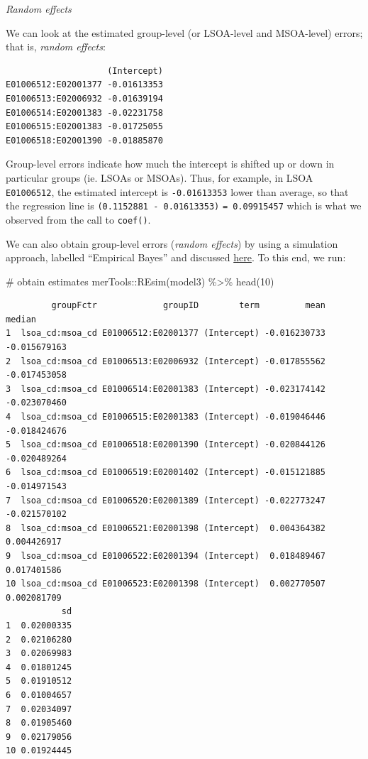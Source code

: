 \documentclass[
  letterpaper,
  DIV=11,
  numbers=noendperiod,
  oneside]{scrreprt}
\newenvironment{Shaded}{\begin{snugshade}}{\end{snugshade}}
\newcommand{\CommentTok}[1]{\textcolor[rgb]{0.37,0.37,0.37}{#1}}
\newcommand{\DecValTok}[1]{\textcolor[rgb]{0.68,0.00,0.00}{#1}}
\newcommand{\FunctionTok}[1]{\textcolor[rgb]{0.28,0.35,0.67}{#1}}
\newcommand{\NormalTok}[1]{\textcolor[rgb]{0.00,0.23,0.31}{#1}}
\newcommand{\OtherTok}[1]{\textcolor[rgb]{0.00,0.23,0.31}{#1}}
\newcommand{\SpecialCharTok}[1]{\textcolor[rgb]{0.37,0.37,0.37}{#1}}
\begin{document}
\emph{Random effects}

We can look at the estimated group-level (or LSOA-level and MSOA-level)
errors; that is, \emph{random effects}:

\begin{Shaded}
\end{Shaded}

\begin{verbatim}
                    (Intercept)
E01006512:E02001377 -0.01613353
E01006513:E02006932 -0.01639194
E01006514:E02001383 -0.02231758
E01006515:E02001383 -0.01725055
E01006518:E02001390 -0.01885870
\end{verbatim}

Group-level errors indicate how much the intercept is shifted up or down
in particular groups (ie. LSOAs or MSOAs). Thus, for example, in LSOA
\texttt{E01006512}, the estimated intercept is \texttt{-0.01613353}
lower than average, so that the regression line is
\texttt{(0.1152881\ -\ 0.01613353)} \texttt{=\ 0.09915457} which is what
we observed from the call to \texttt{coef()}.

We can also obtain group-level errors (\emph{random effects}) by using a
simulation approach, labelled ``Empirical Bayes'' and discussed
\href{https://stat.ethz.ch/pipermail/r-sig-mixed-models/2009q4/002984.html}{here}.
To this end, we run:

\begin{Shaded}
\begin{Highlighting}[]
\CommentTok{\# obtain estimates}
\NormalTok{merTools}\SpecialCharTok{::}\FunctionTok{REsim}\NormalTok{(model3) }\SpecialCharTok{\%\textgreater{}\%} 
  \FunctionTok{head}\NormalTok{(}\DecValTok{10}\NormalTok{)}
\end{Highlighting}
\end{Shaded}

\begin{verbatim}
         groupFctr             groupID        term         mean       median
1  lsoa_cd:msoa_cd E01006512:E02001377 (Intercept) -0.016230733 -0.015679163
2  lsoa_cd:msoa_cd E01006513:E02006932 (Intercept) -0.017855562 -0.017453058
3  lsoa_cd:msoa_cd E01006514:E02001383 (Intercept) -0.023174142 -0.023070460
4  lsoa_cd:msoa_cd E01006515:E02001383 (Intercept) -0.019046446 -0.018424676
5  lsoa_cd:msoa_cd E01006518:E02001390 (Intercept) -0.020844126 -0.020489264
6  lsoa_cd:msoa_cd E01006519:E02001402 (Intercept) -0.015121885 -0.014971543
7  lsoa_cd:msoa_cd E01006520:E02001389 (Intercept) -0.022773247 -0.021570102
8  lsoa_cd:msoa_cd E01006521:E02001398 (Intercept)  0.004364382  0.004426917
9  lsoa_cd:msoa_cd E01006522:E02001394 (Intercept)  0.018489467  0.017401586
10 lsoa_cd:msoa_cd E01006523:E02001398 (Intercept)  0.002770507  0.002081709
           sd
1  0.02000335
2  0.02106280
3  0.02069983
4  0.01801245
5  0.01910512
6  0.01004657
7  0.02034097
8  0.01905460
9  0.02179056
10 0.01924445
\end{verbatim}
\end{document}
